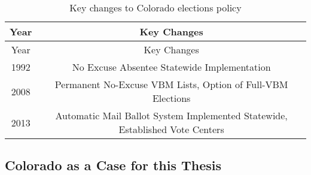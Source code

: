 \documentclass[12pt,twoside]{reedthesis}
\begin{document}
  \begin{longtable}[]{@{}cc@{}}
  \caption{Key changes to Colorado elections policy
  \label{tab:elect_policy}}\tabularnewline
  \toprule
  \begin{minipage}[b]{0.07\columnwidth}\centering\strut
  Year\strut
  \end{minipage} & \begin{minipage}[b]{0.87\columnwidth}\centering\strut
  Key Changes\strut
  \end{minipage}\tabularnewline
  \midrule
  \endfirsthead
  \toprule
  \begin{minipage}[b]{0.07\columnwidth}\centering\strut
  Year\strut
  \end{minipage} & \begin{minipage}[b]{0.87\columnwidth}\centering\strut
  Key Changes\strut
  \end{minipage}\tabularnewline
  \midrule
  \endhead
  \begin{minipage}[t]{0.07\columnwidth}\centering\strut
  1992\strut
  \end{minipage} & \begin{minipage}[t]{0.87\columnwidth}\centering\strut
  No Excuse Absentee Statewide Implementation\strut
  \end{minipage}\tabularnewline
  \begin{minipage}[t]{0.07\columnwidth}\centering\strut
  2008\strut
  \end{minipage} & \begin{minipage}[t]{0.87\columnwidth}\centering\strut
  Permanent No-Excuse VBM Lists, Option of Full-VBM Elections\strut
  \end{minipage}\tabularnewline
  \begin{minipage}[t]{0.07\columnwidth}\centering\strut
  2013\strut
  \end{minipage} & \begin{minipage}[t]{0.87\columnwidth}\centering\strut
  Automatic Mail Ballot System Implemented Statewide, Established Vote
  Centers\strut
  \end{minipage}\tabularnewline
  \bottomrule
  \end{longtable}
  
  \subsection{Colorado as a Case for this
  Thesis}\label{colorado-as-a-case-for-this-thesis}
  
\end{document}
